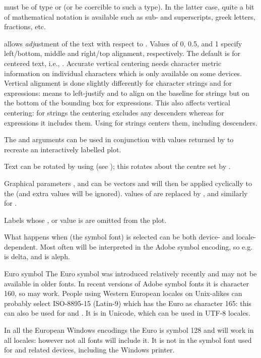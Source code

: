 %
\begin{Details}\relax
{} must be of type  or
 (or be coercible to such a type).
In the latter case, quite a bit of
mathematical notation is available such as sub- and superscripts,
greek letters, fractions, etc.

 allows \emph{adj}ustment of the text with respect to .
Values of 0, 0.5, and 1 specify left/bottom, middle and
right/top alignment, respectively.  The default is for centered text, i.e.,
.  Accurate vertical centering needs
character metric information on individual characters which is
only available on some devices.  Vertical alignment is done slightly
differently for character strings and for expressions:
 means to left-justify and to align on the baseline
for strings but on the bottom of the bounding box for expressions.
This also affects vertical centering: for strings the centering
excludes any descenders whereas for expressions it includes them.
Using  for strings centers them, including descenders.

The  and  arguments can be used in conjunction
with values returned by  to recreate an interactively
labelled plot.

Text can be rotated by using  
(see ); this rotates about the centre set by
.

Graphical parameters ,  and  can be
vectors and will then be applied cyclically to the  (and
extra values will be ignored).   values of  are
replaced by , and similarly for .

Labels whose ,  or  value is 
are omitted from the plot.

What happens when  (the symbol font) is selected can be
both device- and locale-dependent.  Most often  will be
interpreted in the Adobe symbol encoding, so e.g.  is delta,
and  is aleph.
\end{Details}
%
\begin{Section}{Euro symbol}
The Euro symbol was introduced relatively recently and may not be
available in older fonts.  In recent versions of Adobe symbol fonts it
is character 160, so  may work.
People using Western European locales on Unix-alikes can probably
select ISO-8895-15 (Latin-9) which has the Euro as character 165: this
can also be used for  and .
It is  in Unicode, which can be used in UTF-8 locales.

In all the European Windows encodings the Euro is symbol 128 and
 will work in all locales: however not all fonts will
include it.  It is not in the symbol font used for
 and related devices, including the Windows printer.
\end{Section}
